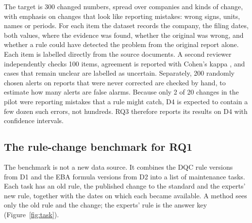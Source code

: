 \documentclass[11pt,a4paper]{article}
\let\oldsubsection\subsection
\renewcommand{\subsection}{\FloatBarrier\oldsubsection}
\begin{document}
The target is 300 changed numbers, spread over companies and kinds of change, with emphasis on changes that look like reporting mistakes: wrong signs, units, names or periods. For each item the dataset records the company, the filing dates, both values, where the evidence was found, whether the original was wrong, and whether a rule could have detected the problem from the original report alone. Each item is labelled directly from the source documents. A second reviewer independently checks 100 items, agreement is reported with Cohen's kappa \cite{cohen}, and cases that remain unclear are labelled as uncertain. Separately, 200 randomly chosen alerts on reports that were never corrected are checked by hand, to estimate how many alerts are false alarms. Because only 2 of 20 changes in the pilot were reporting mistakes that a rule might catch, D4 is expected to contain a few dozen such errors, not hundreds. RQ3 therefore reports its results on D4 with confidence intervals.

\subsection{The rule-change benchmark for RQ1}
\label{sec:benchmark}

The benchmark is not a new data source. It combines the DQC rule versions from D1 and the EBA formula versions from D2 into a list of maintenance tasks. Each task has an old rule, the published change to the standard and the experts' new rule, together with the dates on which each became available. A method sees only the old rule and the change; the experts' rule is the answer key (Figure~\ref{fig:task}).
\end{document}
